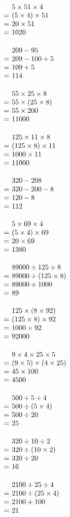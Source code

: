 \documentclass[UTF8]{ctexart}
\makeatletter
\newcommand{\cell}[2]{%
  \begin{minipage}[t][35mm][t]{0.315\textwidth}%
    \vspace{0pt}\linespread{1}#1\selectfont
    \strut#2%
  \end{minipage}%
}
\newcommand{\arow}[3]{%
  \noindent\cell{\zihao{-4}}{#1}\hfill
  \cell{\zihao{-4}}{#2}\hfill
  \cell{\zihao{-4}}{#3}\par\nointerlineskip
}
\newcommand{\eqgap}{0.35em}
\newcommand{\problemline}[1]{#1}
\newcommand{\solution}[1]{%
  \(\begin{array}[t]{@{}r@{\hspace{\eqgap}}l@{}}#1\end{array}\)%
}
\makeatother
\begin{document}
\arow
{\solution{
& \problemline{5\times 51\times 4} \\
= & (5\times 4)\times 51 \\
= & 20\times 51 \\
= & 1020
}}
{\solution{
& \problemline{209-95} \\
= & 209-100+5 \\
= & 109+5 \\
= & 114
}}
{\solution{
& \problemline{55\times 25\times 8} \\
= & 55\times (25\times 8) \\
= & 55\times 200 \\
= & 11000
}}
\arow
{\solution{
& \problemline{125\times 11\times 8} \\
= & (125\times 8)\times 11 \\
= & 1000\times 11 \\
= & 11000
}}
{\solution{
& \problemline{320-208} \\
= & 320-200-8 \\
= & 120-8 \\
= & 112
}}
{\solution{
& \problemline{5\times 69\times 4} \\
= & (5\times 4)\times 69 \\
= & 20\times 69 \\
= & 1380
}}
\arow
{\solution{
& \problemline{89000\div 125\div 8} \\
= & 89000\div (125\times 8) \\
= & 89000\div 1000 \\
= & 89
}}
{\solution{
& \problemline{125\times (8\times 92)} \\
= & (125\times 8)\times 92 \\
= & 1000\times 92 \\
= & 92000
}}
{\solution{
& \problemline{9\times 4\times 25\times 5} \\
= & (9\times 5)\times (4\times 25) \\
= & 45\times 100 \\
= & 4500
}}
\arow
{\solution{
& \problemline{500\div 5\div 4} \\
= & 500\div (5\times 4) \\
= & 500\div 20 \\
= & 25
}}
{\solution{
& \problemline{320\div 10\div 2} \\
= & 320\div (10\times 2) \\
= & 320\div 20 \\
= & 16
}}
{\solution{
& \problemline{2100\div 25\div 4} \\
= & 2100\div (25\times 4) \\
= & 2100\div 100 \\
= & 21
}}
\end{document}

